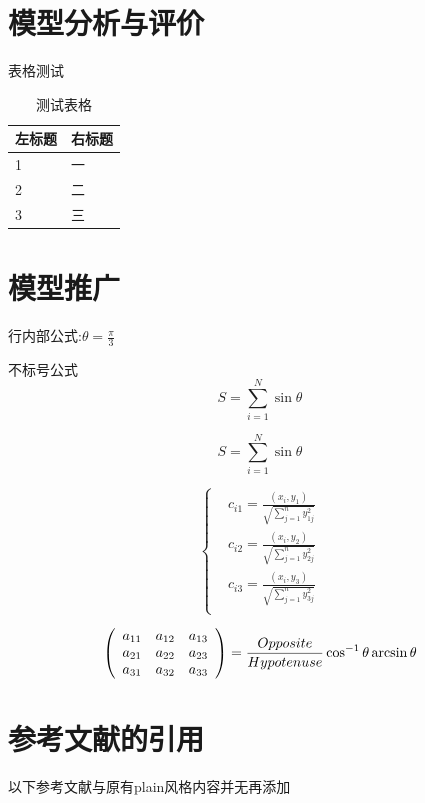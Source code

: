 \documentclass[12pt]{article}%
\begin{document}
\section{模型分析与评价}

表格测试
\begin{table}[!h]
\centering
\caption{测试表格}
\begin{tabular}{C{4cm}|>{}C{4cm}}
\toprule[1pt]
\textbf{左标题} & \textbf{右标题}\\
 & 一\\
 2 & 二\\
 3 & 三\\
\bottomrule[1pt]
\end{tabular}
\end{table}

\section{模型推广}

行内部公式:$ \theta=\frac{\pi}{3} $

不标号公式
\[S=\sum_{i=1}^{N}\sin{\theta}\]

\begin{equation}
S=\sum_{i=1}^{N}\sin{\theta}
\end{equation}

\begin{equation}
\left\{
   \begin{aligned}
   &c_{i1}=\frac{(x_i,y_1)}{\sqrt{\sum_{j=1}^{n}y_{1j}^2}}\\
   &c_{i2}=\frac{(x_i,y_2)}{\sqrt{\sum_{j=1}^{n}y_{2j}^2}}\\
   &c_{i3}=\frac{(x_i,y_3)}{\sqrt{\sum_{j=1}^{n}y_{3j}^2}}\\
   \end{aligned}
   \right.
\end{equation}

\[
\left( {\begin{array}{*{20}c}
   {a_{11}} & {a_{12}} & {a_{13}}  \\
   {a_{21}} & {a_{22}} & {a_{23}}  \\
   {a_{31}} & {a_{32}} & {a_{33}}  \\
\end{array}} \right) = \frac{{Opposite}}{{Hypotenuse}}\cos ^{ - 1} \theta \arcsin \theta
\]
\section{参考文献的引用}
\noindent 以下参考文献与原有plain风格内容并无再添加
\end{document}
